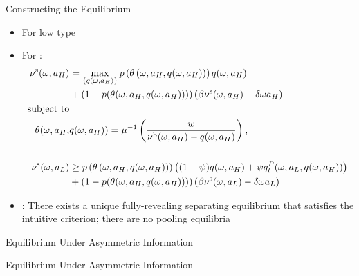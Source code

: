 \documentclass[english,xcolor=svgnames,aspectratio=169]{beamer}
\newcommand{\Buyer}{^\mathrm{b}}
\begin{document}
\begin{frame}{Constructing the Equilibrium}

\begin{itemize}

\item For low type \medskip

\item For {\color{dblue}{\bf high type}}:
{\small\begin{align*}
\nu^{\mathrm{s}}(\omega,a_{H}) & = \max_{\{ q(\omega, a_{H})\}} p\left(\theta\left(\omega,a_{H},{q}(\omega, a_{H})\right)\right)  q(\omega,a_{H})    \\ \notag
&+ \left(1-  p(\theta(\omega,a_{H},{q}(\omega, a_{H})))\right) \left(\beta \nu^{\mathrm{s}}(\omega,a_{H}) - \delta \omega a_{H}\right)\\
\text{subject to}\\
\theta(\omega,a_{H},&q(\omega,a_{H})) = \mu^{-1} \left( \frac{w}{\nu\Buyer(\omega,a_{H})   - q(\omega,a_{H})} \right),\\
\\ \notag
\nu^{\mathrm{s}}(\omega,a_{L}) & \geq p\left(\theta\left(\omega,a_{H},{q}(\omega, a_{H})\right)\right) \left((1-\psi) q(\omega,a_{H}) + \psi q^P_{t}(\omega,a_{L},{q}(\omega, a_{H}))\right) \\ \notag
&+ \left(1-  p(\theta(\omega,a_{H},{q}(\omega, a_{H})))\right) \left(\beta \nu^{\mathrm{s}}(\omega,a_{L}) - \delta \omega a_{L}\right)
\end{align*}} 
\item {\color{dblue}{Proposition}}: There exists a unique fully-revealing separating equilibrium that satisfies the intuitive criterion; there are no pooling equilibria \bigskip
\end{itemize}

\end{frame}




\begin{frame}{Equilibrium Under Asymmetric Information}
\begin{figure}
\end{figure}
\end{frame}


\begin{frame}{Equilibrium Under Asymmetric Information}
\begin{figure}
\end{figure}
\end{frame}
\end{document}
